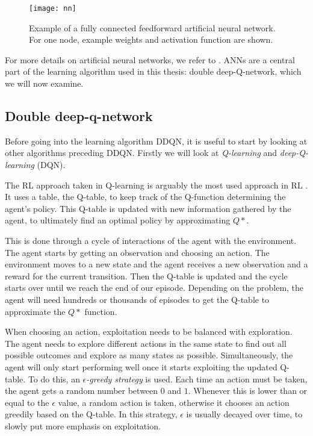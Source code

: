 \begin{figure}[h]
    \centering
    \texttt{[image: nn]}
    \caption{Example of a fully connected feedforward artificial neural network. For one node, example weights and activation function are shown.}
    \label{fig:nn}
\end{figure}

For more details on artificial neural networks, we refer to \cite{nn}. ANNs are a central part of the learning algorithm used in this thesis: double deep-Q-network, which we will now examine.

\subsection{Double deep-q-network}\label{pl-dqn}
Before going into the learning algorithm DDQN, it is useful to start by looking at other algorithms preceding DDQN. Firstly we will look at \emph{Q-learning} and \emph{deep-Q-learning} (DQN). 

The RL approach taken in Q-learning is arguably the most used approach in RL \cite{qlearning}. It uses a table, the Q-table, to keep track of the Q-function determining the agent's policy. This Q-table is updated with new information gathered by the agent, to ultimately find an optimal policy by approximating $Q*$.

This is done through a cycle of interactions of the agent with the environment. The agent starts by getting an observation and choosing an action. The environment moves to a new state and the agent receives a new observation and a reward for the current transition. Then the Q-table is updated and the cycle starts over until we reach the end of our episode. Depending on the problem, the agent will need hundreds or thousands of episodes to get the Q-table to approximate the $Q*$ function.

When choosing an action, exploitation needs to be balanced with exploration. The agent needs to explore different actions in the same state to find out all possible outcomes and explore as many states as possible. Simultaneously, the agent will only start performing well once it starts exploiting the updated Q-table. To do this, an \emph{$\epsilon$-greedy strategy} is used. Each time an action must be taken, the agent gets a random number between $0$ and $1$. Whenever this is lower than or equal to the $\epsilon$ value, a random action is taken, otherwise it chooses an action greedily based on the Q-table. In this strategy, $\epsilon$ is usually decayed over time, to slowly put more emphasis on exploitation.

